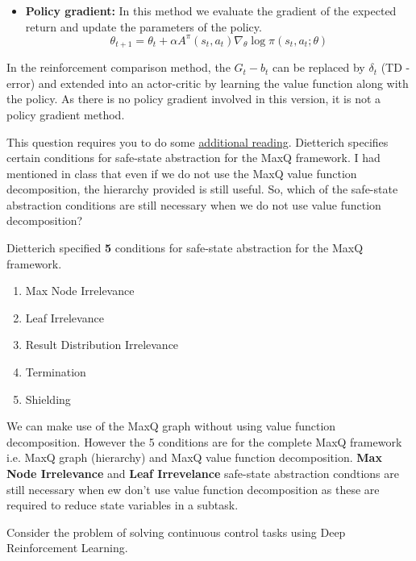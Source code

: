 \documentclass[solution,addpoints,12pt]{exam}
\begin{document}
\begin{questions}
\begin{solution}
\begin{itemize}
 \item \textbf{Policy gradient:}
 In this method we evaluate the gradient of the expected return and update the parameters of the policy.
 \begin{equation}
  \theta_{t+1} = \theta_{t} + \alpha A^{\pi}(s_{t},a_{t}) \nabla_{\theta} \log \pi(s_{t},a_{t};\theta)
  \end{equation}
\end{itemize}
    In the reinforcement comparison method, the $G_{t} - b_{t}$ can be replaced by $\delta_{t}$ (TD - error) and extended into an actor-critic by learning the value function along with the policy. As there is no policy gradient involved in this version, it is not a policy gradient method.
\end{solution}


\question[4]
This question requires you to do some \href{https://arxiv.org/abs/cs/9905014}{additional reading}.  Dietterich specifies certain conditions for safe-state abstraction for the MaxQ framework.  I had mentioned in class that even if we do not use the MaxQ value function decomposition, the hierarchy provided is still useful.  So, which of the safe-state abstraction conditions are still necessary when we do not use value function decomposition?
\begin{solution}
Dietterich specified \textbf{5} conditions for safe-state abstraction for the MaxQ framework.

\begin{enumerate}
 \item Max Node Irrelevance
 \item Leaf Irrelevance
 \item Result Distribution Irrelevance
 \item Termination
 \item Shielding
\end{enumerate}

We can make use of the MaxQ graph without using value function decomposition. However the 5 conditions are for the complete MaxQ framework i.e. MaxQ graph (hierarchy) and MaxQ value function decomposition.  \textbf{Max Node Irrelevance} and \textbf{Leaf Irrevelance} safe-state abstraction condtions are still necessary when ew don't use value function decomposition as these are required to reduce state variables in a subtask.
\end{solution}

\question[3] Consider the problem of solving continuous control tasks using Deep Reinforcement Learning.


\end{questions}
\end{document}
